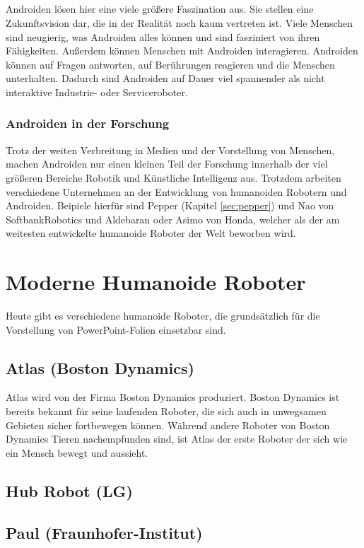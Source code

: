 \subparagraph{}
Androiden lösen hier eine viele größere Faszination aus. Sie
stellen eine Zukunftsvision dar, die in der Realität noch kaum vertreten ist.
Viele Menschen sind neugierig, was Androiden alles können und sind fasziniert
von ihren Fähigkeiten. Außerdem können Menschen mit Androiden interagieren.
Androiden können auf Fragen antworten, auf Berührungen reagieren und die
Menschen unterhalten. Dadurch sind Androiden auf Dauer viel spannender als nicht
interaktive Industrie- oder Serviceroboter.

\subsubsection{Androiden in der Forschung}
Trotz der weiten Verbreitung in Medien und der Vorstellung von
Menschen, machen Androiden nur einen kleinen Teil der Forschung innerhalb der
viel größeren Bereiche Robotik und Künstliche Intelligenz aus.
\cite{Dautenhahn2011} Trotzdem arbeiten verschiedene Unternehmen an der
Entwicklung von humanoiden Robotern und Androiden. Beipiele hierfür sind Pepper
(Kapitel \ref{sec:pepper}) und Nao von SoftbankRobotics und Aldebaran oder Asimo
von Honda, welcher als der am weitesten entwickelte humanoide Roboter der Welt
beworben wird. \cite{Honda2018}

\section{Moderne Humanoide Roboter}\label{sec:moderne-humanoide-roboter}
Heute gibt es verschiedene humanoide Roboter, die grundsätzlich für die
Vorstellung von PowerPoint-Folien einsetzbar sind.

\subsection{Atlas (Boston Dynamics)}
Atlas wird von der Firma Boston Dynamics produziert. Boston Dynamics ist bereits
bekannt für seine laufenden Roboter, die sich auch in unwegsamen Gebieten sicher
fortbewegen können. Während andere Roboter von Boston Dynamics Tieren
nachempfunden sind, ist Atlas der erste Roboter der sich wie ein Mensch bewegt
und aussieht.

\subsection{Hub Robot (LG)}

\subsection{Paul (Fraunhofer-Institut)}

